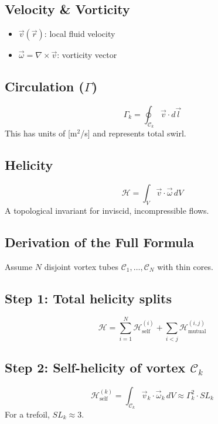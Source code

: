 \documentclass[a4paper,12pt]{article}
\begin{document}
    \subsection*{ Velocity \& Vorticity}
    \begin{itemize}
        \item $\vec{v}(\vec{r})$: local fluid velocity
        \item $\vec{\omega} = \nabla \times \vec{v}$: vorticity vector
    \end{itemize}

    \subsection*{ Circulation ($\Gamma$)}
    \begin{equation}
        \Gamma_k = \oint_{\mathcal{C}_k} \vec{v} \cdot d\vec{l}
    \end{equation}
    This has units of [m$^2$/s] and represents total swirl.

    \subsection*{ Helicity}
    \begin{equation}
        \mathcal{H} = \int_V \vec{v} \cdot \vec{\omega} \, dV
    \end{equation}
    A topological invariant for inviscid, incompressible flows.

    \subsection{ Derivation of the Full Formula}
    Assume $N$ disjoint vortex tubes $\mathcal{C}_1, \dots, \mathcal{C}_N$ with thin cores.

    \subsection*{Step 1: Total helicity splits}
    \begin{equation}
        \mathcal{H} = \sum_{i=1}^N \mathcal{H}_{\text{self}}^{(i)} + \sum_{i < j} \mathcal{H}_{\text{mutual}}^{(i,j)}
    \end{equation}

    \subsection*{Step 2: Self-helicity of vortex $\mathcal{C}_k$}
    \begin{equation}
        \mathcal{H}_{\text{self}}^{(k)} = \int_{\mathcal{C}_k} \vec{v}_k \cdot \vec{\omega}_k \, dV \approx \Gamma_k^2 \cdot SL_k
    \end{equation}
    For a trefoil, $SL_k \approx 3$.
\end{document}
